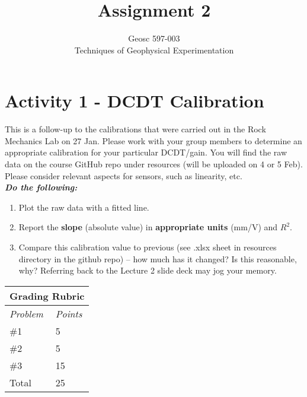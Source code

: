\documentclass[10pt]{article}
\begin{document}

\title{Assignment 2}%
\author{Geosc 597-003\\
Techniques of Geophysical Experimentation} %

\maketitle


\section*{Activity 1 - DCDT Calibration}

This is a follow-up to the calibrations that were carried out in the Rock Mechanics Lab on 27 Jan. Please work with your group members to determine an appropriate calibration for your particular DCDT/gain. You will find the raw data on the course GitHub repo under resources (will be uploaded on 4 or 5 Feb). \\ 
Please consider relevant aspects for sensors, such as linearity, etc. \\

\noindent\textbf{\textit{Do the following:}}
\begin{enumerate}
		\item Plot the raw data with a fitted line.
		\item Report the \textbf{slope} (absolute value) in \textbf{appropriate units} (mm/V) and $ R^2 $.
		\item Compare this calibration value to previous (see .xlsx sheet in resources directory in the github repo) -- how much has it changed? Is this reasonable, why? Referring back to the Lecture 2 slide deck may jog your memory.
\end{enumerate}

\begin{table}[h!]
	\footnotesize
	\centering
	\begin{tabular}{@{}ll@{}}
		\multicolumn{2}{c}{\textbf{Grading Rubric}} \\ \midrule 
		\multicolumn{1}{l}{\textit{Problem}}   & \textit{Points}   \\ \midrule 
		\#1                    & 5       \\ \midrule
		\#2            & 5       \\ \midrule
		\#3            & 15       \\ \midrule
		Total                            & 25       \\ \bottomrule
	\end{tabular}
\end{table}
\end{document}
